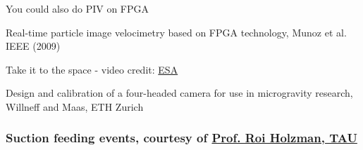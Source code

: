 %    
%    
    \begin{frame}[label=app-110a]{You could also do PIV on FPGA}
    \begin{cardTiny}
    Real-time particle image velocimetry based on FPGA technology, Munoz et al. IEEE (2009)
    \end{cardTiny}
    \end{frame}
%    
%    
\begin{frame}[label=app-11a]{Take it to the space - video credit: \href{https://www.dropbox.com/s/59ophf177gcfjzq/boiling_microgravity.mp4?raw=1}{ESA}}
    \begin{cardTiny}
    Design and calibration of a four-headed camera for use in microgravity research, Willneff and Maas, ETH Zurich
    \end{cardTiny}
\end{frame}
    

\begin{frame}[label=app-1]
    \frametitle{Suction feeding events, courtesy of \href{https://www.dropbox.com/s/wcytdkxuxxvn4q0/fish_feeding.mp4?raw=1}{Prof. Roi Holzman, TAU}}
\end{frame}
    
